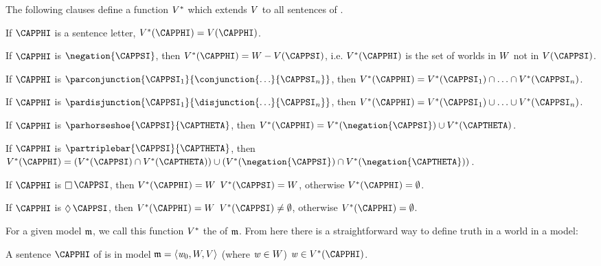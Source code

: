 \begin{majorILnc}{}
The following clauses define a function $V^*$ which extends $V$ to all sentences of \MGSL{}.
\begin{cenumerate}
\item If $\CAPPHI$ is a sentence letter, $\integer{V}^*(\CAPPHI)=\integer{V}(\CAPPHI)$.
\item If $\CAPPHI$ is $\negation{\CAPPSI}$, then $\integer{V}^*(\CAPPHI)=W-\integer{V}(\CAPPSI)$, i.e. $\integer{V}^*(\CAPPHI)$ is the set of worlds in $W$ not in $\integer{V}(\CAPPSI)$.
\item If $\CAPPHI$ is $\parconjunction{\CAPPSI_1}{\conjunction{\ldots}{\CAPPSI_{\integer{n}}}}$, then $\integer{V}^*(\CAPPHI)=\integer{V}^*(\CAPPSI_1)\cap\ldots\cap\integer{V}^*(\CAPPSI_{\integer{n}})$.
\item If $\CAPPHI$ is $\pardisjunction{\CAPPSI_1}{\disjunction{\ldots}{\CAPPSI_{\integer{n}}}}$, then $\integer{V}^*(\CAPPHI)=\integer{V}^*(\CAPPSI_1)\cup\ldots\cup\integer{V}^*(\CAPPSI_{\integer{n}})$.
\item If $\CAPPHI$ is $\parhorseshoe{\CAPPSI}{\CAPTHETA}$, then $\integer{V}^*(\CAPPHI)=\integer{V}^*(\negation{\CAPPSI})\cup\integer{V}^*(\CAPTHETA)$.
\item If $\CAPPHI$ is $\partriplebar{\CAPPSI}{\CAPTHETA}$, then $\integer{V}^*(\CAPPHI)=(\integer{V}^*(\CAPPSI)\cap\integer{V}^*(\CAPTHETA))\cup(\integer{V}^*(\negation{\CAPPSI})\cap\integer{V}^*(\negation{\CAPTHETA}))$.
\item If $\CAPPHI$ is $\BOX\CAPPSI$, then $\integer{V}^*(\CAPPHI)=W$ \Iff $\integer{V}^*(\CAPPSI)=W$, otherwise $\integer{V}^*(\CAPPHI)=\emptyset$.
\item If $\CAPPHI$ is $\DIAMOND\CAPPSI$, then $\integer{V}^*(\CAPPHI)=W$ \Iff $\integer{V}^*(\CAPPSI)\neq\emptyset$, otherwise $\integer{V}^*(\CAPPHI)=\emptyset$.
\end{cenumerate}
\end{majorILnc}
\noindent{}For a given model $\mathfrak{m}$, we call this function $V^*$ the  of $\mathfrak{m}$. 
From here there is a straightforward way to define truth in a world in a model:
\begin{majorILnc}{}
A sentence $\CAPPHI$ of \MGSL{} is  in model $\mathfrak{m}=\langle\mathit{w}_0,W,V\rangle$ (where $\mathit{w}\in W$) \Iff $\world{w}\in\integer{V}^*(\CAPPHI)$.
\end{majorILnc}

